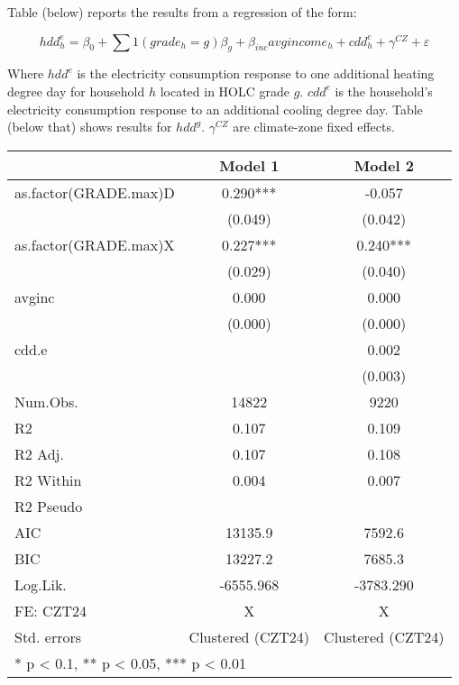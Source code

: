 \documentclass[
]{article}
\begin{document}
Table (below) reports the results from a regression of the form:

\[hdd^e_h = \beta_0 + \sum 1(grade_h=g)\beta_g + \beta_{inc} avgincome_h + cdd^e_h + \gamma^{CZ} + \varepsilon\]

Where \(hdd^e\) is the electricity consumption response to one
additional heating degree day for household \(h\) located in HOLC grade
\(g\). \(cdd^e\) is the household's electricity consumption response to
an additional cooling degree day. Table (below that) shows results for
\(hdd^g\). \(\gamma^{CZ}\) are climate-zone fixed effects.

\begin{table}[H]
\centering
\begin{tabular}[t]{lcc}
\toprule
  & Model 1 & Model 2\\
\midrule
as.factor(GRADE.max)D & 0.290*** & -0.057\\
 & (0.049) & (0.042)\\
as.factor(GRADE.max)X & 0.227*** & 0.240***\\
 & (0.029) & (0.040)\\
avginc & 0.000 & 0.000\\
 & (0.000) & (0.000)\\
cdd.e &  & 0.002\\
 &  & (0.003)\\
\midrule
Num.Obs. & 14822 & 9220\\
R2 & 0.107 & 0.109\\
R2 Adj. & 0.107 & 0.108\\
R2 Within & 0.004 & 0.007\\
R2 Pseudo &  & \\
AIC & 13135.9 & 7592.6\\
BIC & 13227.2 & 7685.3\\
Log.Lik. & -6555.968 & -3783.290\\
FE: CZT24 & X & X\\
Std. errors & Clustered (CZT24) & Clustered (CZT24)\\
\bottomrule
\multicolumn{3}{l}{\textsuperscript{} * p < 0.1, ** p < 0.05, *** p < 0.01}\\
\end{tabular}
\end{table}
\end{document}
